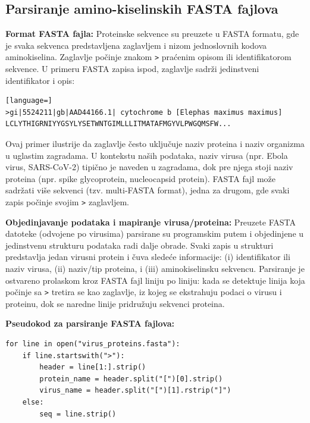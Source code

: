 \documentclass[a4paper,12pt]{article}
\begin{document}
\subsection{Parsiranje amino-kiselinskih FASTA fajlova}

\textbf{Format FASTA fajla:} Proteinske sekvence su preuzete u FASTA formatu, gde je svaka sekvenca
predstavljena zaglavljem i nizom jednoslovnih kodova aminokiselina. Zaglavlje počinje znakom \texttt{>} praćenim
opisom ili identifikatorom sekvence. U primeru FASTA zapisa ispod, zaglavlje sadrži jedinstveni identifikator i opis:

\begin{lstlisting}[language=]
>gi|5524211|gb|AAD44166.1| cytochrome b [Elephas maximus maximus]
LCLYTHIGRNIYYGSYLYSETWNTGIMLLLITMATAFMGYVLPWGQMSFW...
\end{lstlisting}

Ovaj primer ilustrije da zaglavlje često uključuje naziv proteina i naziv organizma u uglastim zagradama. U kontekstu naših podataka, naziv virusa (npr. Ebola virus, SARS-CoV-2) tipično je naveden u zagradama,
dok pre njega stoji naziv proteina (npr. spike glycoprotein, nucleocapsid protein). FASTA fajl može sadržati više
sekvenci (tzv. multi-FASTA format), jedna za drugom, gde svaki zapis počinje svojim \texttt{>} zaglavljem.

\vspace{10pt}
\textbf{Objedinjavanje podataka i mapiranje virusa/proteina:} Preuzete FASTA datoteke (odvojene
po virusima) parsirane su programskim putem i objedinjene u jedinstvenu
strukturu podataka radi dalje obrade. Svaki zapis u strukturi predstavlja jedan virusni protein i čuva sledeće
informacije: (i) identifikator ili naziv virusa, (ii) naziv/tip proteina, i (iii) aminokiselinsku sekvencu. Parsiranje
je ostvareno prolaskom kroz FASTA fajl liniju po liniju: kada se detektuje linija koja počinje sa \texttt{>} tretira se
kao zaglavlje, iz kojeg se ekstrahuju podaci o virusu i proteinu, dok se naredne linije pridružuju sekvenci
proteina. 

\vspace{10pt}
\textbf{Pseudokod za parsiranje FASTA fajlova:}

\begin{lstlisting}
for line in open("virus_proteins.fasta"):
    if line.startswith(">"):
        header = line[1:].strip()
        protein_name = header.split("[")[0].strip()
        virus_name = header.split("[")[1].rstrip("]")
    else:
        seq = line.strip() 
\end{lstlisting}
\end{document}
